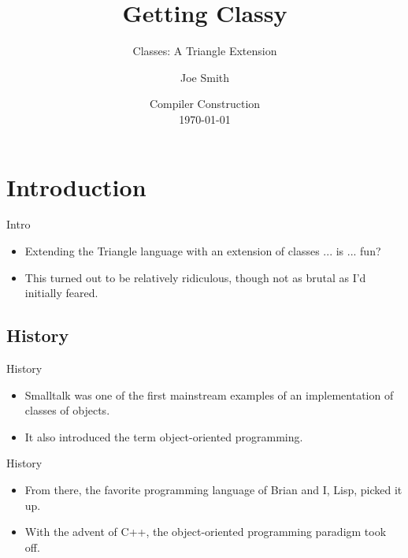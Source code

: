 \documentclass{beamer}
\title[] %
{Getting Classy}
\subtitle
{Classes: A Triangle Extension} %
\author{Joe Smith} %
\institute[] %
{
  Department of Computer Science\\
  Chapman University}
\date[] %
{Compiler Construction\\ \today}
\begin{document}





\section{Introduction}
\begin{frame}{Intro}
	\begin{itemize}
	\item
	Extending the Triangle language with an extension of classes ... is ... fun? 
	\item
	This turned out to be relatively ridiculous, though not as brutal as I'd initially feared.
	\end{itemize}
\end{frame}

\subsection{History}
\begin{frame}{History}
	\begin{itemize}
	\item
	Smalltalk was one of the first mainstream examples of an implementation of classes of objects.
	\item
	It also introduced the term \alert{object-oriented programming}.
	\end{itemize}
\end{frame}

\begin{frame}{History}
	\begin{itemize}
	\item
	From there, the favorite programming language of Brian and I, Lisp, picked it up.
	\item
	With the advent of C++, the object-oriented programming paradigm took off.
	\end{itemize}
\end{frame}
\end{document}

